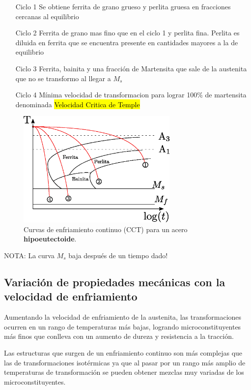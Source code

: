 \documentclass{article}
\begin{document}
\begin{itemize}
    \item[Ciclo 1] Se obtiene ferrita de grano grueso y perlita gruesa en fracciones cercanas al equilibrio
    \item[Ciclo 2] Ferrita de grano mas fino que en el ciclo 1 y perlita fina. Perlita es diluida en ferrita que se encuentra presente en cantidades mayores a la de equilibrio
    \item[Ciclo 3] Ferrita, bainita y una fracción de Martensita que sale de la austenita que no se transformo al llegar a $M_s$
    \item[Ciclo 4] Mínima velocidad de transformacion para lograr 100\% de martensita denominada \hl{Velocidad Critica de Temple}
\end{itemize}

\begin{figure}[htb!]
    \centering
    \includegraphics[width=0.7\textwidth]{fig/CCThipo.eps}
    \caption{Curvas de enfriamiento continuo (CCT) para un acero \textbf{hipoeutectoide}.}
    \label{fig:CCThipo}
\end{figure}

NOTA: La curva $M_s$ baja después de un tiempo dado!


\subsection{Variación de propiedades mecánicas con la velocidad de enfriamiento}
Aumentando la velocidad de enfriamiento de la austenita, las transformaciones ocurren en un rango de temperaturas más bajas, logrando microconstituyentes más finos que conlleva con un aumento de dureza y resistencia a la tracción. 

Las estructuras que surgen de un enfriamiento continuo son más complejas que las de transformaciones isotérmicas ya que al pasar por un rango más amplio de temperaturas de transformación se pueden obtener mezclas muy variadas de los microconstituyentes.
\end{document}
